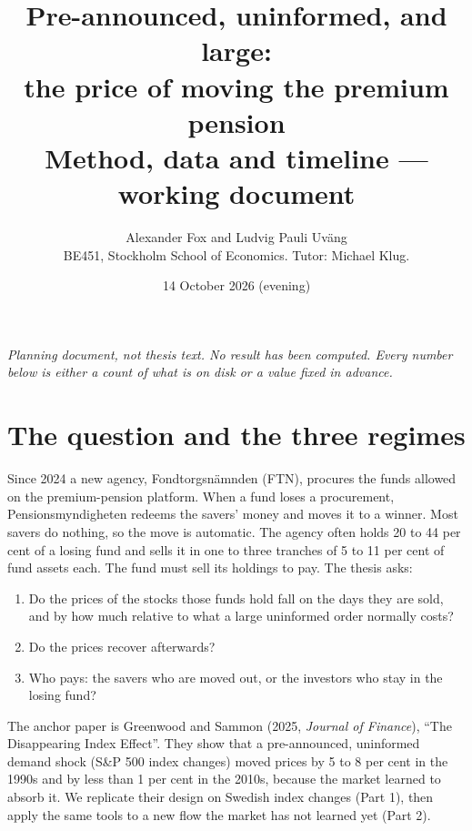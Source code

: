 \documentclass[11pt,a4paper]{article}
\title{\textbf{Pre-announced, uninformed, and large:\\ the price of moving the premium pension}\\[6pt]
\large Method, data and timeline --- working document}
\author{Alexander Fox and Ludvig Pauli Uväng\\ \small BE451, Stockholm School of Economics. Tutor: Michael Klug.}
\date{14 October 2026 (evening)}
\begin{document}
\maketitle

\begin{center}
\small\itshape Planning document, not thesis text. No result has been computed. Every number below is either a count of what is on disk or a value fixed in advance.
\end{center}

\section{The question and the three regimes}

Since 2024 a new agency, Fondtorgsnämnden (FTN), procures the funds allowed on the premium-pension platform. When a fund loses a procurement, Pensionsmyndigheten redeems the savers' money and moves it to a winner. Most savers do nothing, so the move is automatic. The agency often holds 20 to 44 per cent of a losing fund and sells it in one to three tranches of 5 to 11 per cent of fund assets each. The fund must sell its holdings to pay. The thesis asks:

\begin{enumerate}[nosep]
\item Do the prices of the stocks those funds hold fall on the days they are sold, and by how much relative to what a large uninformed order normally costs?
\item Do the prices recover afterwards?
\item Who pays: the savers who are moved out, or the investors who stay in the losing fund?
\end{enumerate}

The anchor paper is Greenwood and Sammon (2025, \emph{Journal of Finance}), ``The Disappearing Index Effect''. They show that a pre-announced, uninformed demand shock (S\&P 500 index changes) moved prices by 5 to 8 per cent in the 1990s and by less than 1 per cent in the 2010s, because the market learned to absorb it. We replicate their design on Swedish index changes (Part 1), then apply the same tools to a new flow the market has not learned yet (Part 2).
\end{document}
